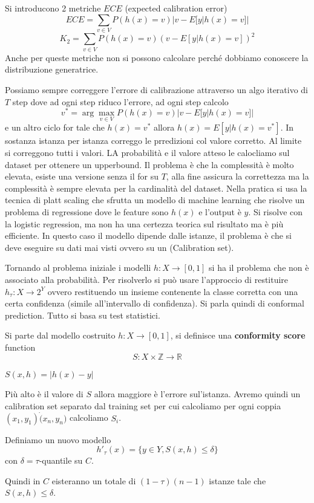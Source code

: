 Si introducono 2 metriche $ECE$ (expected calibration error) 
$$ECE = \sum_{v\in V}P(h(x)=v)|v-E[y|h(x)=v]|$$
$$K_2 = \sum_{v\in V}P(h(x)=v)(v-E[y|h(x)=v])^2$$
Anche per queste metriche non si possono calcolare perché dobbiamo conoscere la distribuzione generatrice.

Possiamo sempre correggere l'errore di calibrazione attraverso un algo iterativo di $T$ step dove ad ogni step 
riduco l'errore, ad ogni step calcolo 
$$v^\ast = \arg\max_{v\in V}P(h(x)=v)|v-E[y|h(x)=v]|$$ 
e un altro ciclo for tale che $h(x)=v^\ast $ allora $h(x)=E[y|h(x)=v^\ast]$. 
In sostanza istanza per istanza correggo le prredizioni col valore corretto. Al limite si correggono tutti i valori.
LA probabilità e il valore atteso le calocliamo sul dataset per ottenere un upperbound. Il problema è che 
la complessità è molto elevata, esiste una versione senza il for su $T$, alla fine assicura la correttezza 
ma la complessità è sempre elevata per la cardinalità del dataset. Nella pratica si usa la tecnica 
di platt scaling che sfrutta un modello di machine learning che risolve un problema di regressione 
dove le feature sono $h(x)$ e l'output è $y$. Si risolve con la logistic regression,
ma non ha una certezza teorica sul risultato ma è più efficiente.
In questo caso il modello dipende dalle istanze, il problema è che si deve eseguire 
su dati mai visti ovvero su un (Calibration set).

Tornando al problema iniziale i modelli $h:X\to [0,1]$  si ha il problema che non 
è associato alla probabilità. Per risolverlo si può usare l'approccio di 
restituire $h_\tau :X\to 2^Y$ ovvero restituendo un insieme contenente la classe 
corretta con una certa confidenza (simile all'intervallo di confidenza). Si parla 
quindi di conformal prediction. Tutto si basa su test statistici.

Si parte dal modello costruito $h:X\to [0,1]$, si definisce una \textbf{conformity score}
function 
$$S:X\times \mathbb{Z} \to \mathbb{R}$$
\begin{esempio}
    $S(x,h) = |h(x)-y|$
\end{esempio}
Più alto è il valore di $S$ allora maggiore è l'errore sul'istanza. Avremo 
quindi un calibration set separato dal training set per cui calcoliamo per ogni
coppia $(x_1,y_1)\dot(x_n,y_n)$ calcoliamo $S_i$.

Definiamo un nuovo modello 
$$h'_\tau(x)=\{y\in Y, S(x,h)\le \delta\}$$
con $\delta = \tau$-quantile su $C$. 

Quindi in $C$ eisteranno un totale di $(1-\tau)(n-1)$ istanze tale che $S(x,h)\le \delta$.

